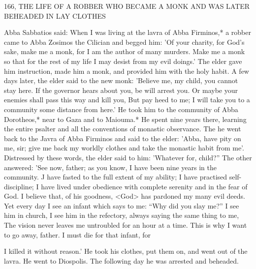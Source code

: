 166, THE LIFE OF A ROBBER WHO BECAME A MONK
AND WAS LATER BEHEADED IN LAY CLOTHES

Abba Sabbatios said: When I was living at the lavra of Abba
Firminos,* a robber came to Abba Zosimos the Cilician and begged
him: 'Of your charity, for God's sake, make me a monk, for I am
the author of many murders.
Make me a monk so that for the rest
of my life I may desist from my evil doings.' The elder gave him
instruction, made him a monk, and provided him with the holy
habit.
A few days later, the elder said to the new monk: 'Believe me,
my child, you cannot stay here.
If the governor hears about you, be
will arrest you.
Or maybe your enemies shall pass this way and kill
you, But pay heed to me; I will take you to a community some
distance from here.' He took him to the community of Abba
Dorotheos,* near to Gaza and to Maiouma.* He spent nine years
there, learning the entire psalter and all the conventions of monastic
observance.
The he went back to the Javra of Abba Firminos and
said to the elder: 'Abba, have pity on me, sir; give me back my
worldly clothes and take the monastic habit from me'.
Distressed by
these words, the elder said to him: 'Whatever for, child?” The other
answered: 'See now, father; as you know, I have been nine years in
the community.
J have fasted to the full extent of my ability; I have
practised self-discipline; I have lived under obedience with complete
serenity and in the fear of God.
I believe that, of his goodness,
<God> has pardoned my many evil deeds.
Yet every day I see an
infant which says to me: “Why did you slay me?” I see him in
church, I see him in the refectory, always saying the same thing to
me, The vision never leaves me untroubled for an hour at a time.
This is why I want to go away, father.
I must die for that infant, for

I killed it without reason.' He took his clothes, put them on, and
went out of the lavra.
He went to Diospolis.
The following day he
was arrested and beheaded.

